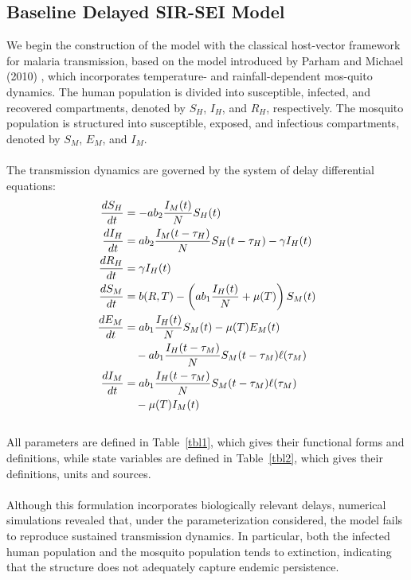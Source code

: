 \documentclass[a4paper,fleqn]{cas-dc}
\begin{document}
\subsection{Baseline Delayed SIR-SEI Model}
\label{sec:baseline_delayed_sir_sei}

We begin the construction of the model with the classical host-vector framework for malaria transmission, based on the model introduced by Parham and Michael (2010) \cite{Parham2010}, 
which incorporates temperature- and rainfall-dependent mos-quito dynamics. The human population is divided into susceptible, infected, 
and recovered compartments, denoted by $S_H$, $I_H$, and $R_H$, respectively. The mosquito population is structured into susceptible, 
exposed, and infectious compartments, denoted by $S_M$, $E_M$, and $I_M$.
\\\\
The transmission dynamics are governed by the system of delay differential equations:
\begin{subequations}\label{eq:system}
\begin{align}
\frac{dS_H}{dt} &= - a b_2 \frac{I_M(t)}{N} S_H(t) \label{eq:systema} \\
\frac{dI_H}{dt} &= a b_2 \frac{I_M(t - \tau_H)}{N} S_H(t - \tau_H) - \gamma I_H(t) \label{eq:systemb} \\
\frac{dR_H}{dt} &= \gamma I_H(t) \label{eq:systemc} \\
\frac{dS_M}{dt} &= b(R,T) - \left(a b_1 \frac{I_H(t)}{N} + \mu(T)\right) S_M(t) \label{eq:systemd} \\
\frac{dE_M}{dt} &= a b_1 \frac{I_H(t)}{N} S_M(t) - \mu(T) E_M(t) \notag \\
&\quad - a b_1 \frac{I_H(t - \tau_M)}{N} S_M(t - \tau_M)\ell(\tau_M) \label{eq:systeme} \\
\frac{dI_M}{dt} &= a b_1 \frac{I_H(t - \tau_M)}{N} S_M(t - \tau_M)\ell(\tau_M) \notag \\
&\quad - \mu(T) I_M(t) \label{eq:systemf} 
\end{align}
\end{subequations}
\\
All parameters are defined in
Table~\ref{tbl1}, which gives their functional forms and definitions, while state variables are defined in
Table~\ref{tbl2}, which gives their definitions, units and sources.
\\\\
Although this formulation incorporates biologically relevant delays, numerical simulations revealed that, under 
the parameterization considered, the model fails to reproduce sustained transmission dynamics. In particular, 
both the infected human population and the mosquito population tends to extinction, indicating that the structure does not adequately capture endemic persistence.
\end{document}
